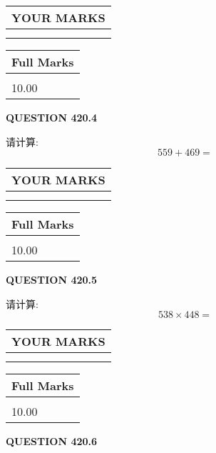 \documentclass{ctexart}
\begin{document}
\noindent\begin{tabular}{|l|}
\hline
 YOUR MARKS  \\
\hline
 \\ 
 \\ 
\hline
\end{tabular}
\hspace{0.05in} \begin{tabular}{|l|}
\hline
 Full Marks  \\
\hline
 \\ 
10.00 \\
\hline
\end{tabular}
{\textbf{\Large{QUESTION
420.4 
}}}
  
  
 
请计算:
\begin{equation}
559 +  %
469 = \nonumber
\end{equation}
 

 

 
  
\vspace{0.2in}
  
\noindent\begin{tabular}{|l|}
\hline
 YOUR MARKS  \\
\hline
 \\ 
 \\ 
\hline
\end{tabular}
\hspace{0.05in} \begin{tabular}{|l|}
\hline
 Full Marks  \\
\hline
 \\ 
10.00 \\
\hline
\end{tabular}
{\textbf{\Large{QUESTION
420.5 
}}}
  
  
 
请计算:
\begin{equation}
538  \times    %
448 = \nonumber
\end{equation}
 

 

 
  
\vspace{0.2in}
  
\noindent\begin{tabular}{|l|}
\hline
 YOUR MARKS  \\
\hline
 \\ 
 \\ 
\hline
\end{tabular}
\hspace{0.05in} \begin{tabular}{|l|}
\hline
 Full Marks  \\
\hline
 \\ 
10.00 \\
\hline
\end{tabular}
{\textbf{\Large{QUESTION
420.6 
}}}
  
\end{document}
